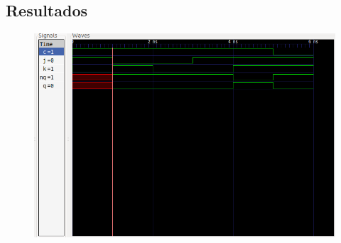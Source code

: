 \newpage
\subsection*{Resultados}
\begin{figure}[h]
    \centering
    \includegraphics[scale=0.5]{fotos/resultados/arki-lab2-R_jklatch.png}
\end{figure}